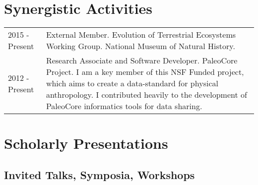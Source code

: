 \documentclass{article}
\begin{document}
\section*{Synergistic Activities}
\begin{tabular}{p{}p{}}

2015 - Present & External Member. Evolution of Terrestrial Ecosystems Working Group. National Museum of Natural History.\\[4pt]

2012 - Present & Research Associate and Software Developer. PaleoCore Project. I am a key member of this NSF Funded project, which aims to create a data-standard for physical anthropology. I contributed heavily to the development of PaleoCore informatics tools for data sharing.\\
\end{tabular}

\section*{Scholarly Presentations}
\subsection*{Invited Talks, Symposia, Workshops}
\end{document}

